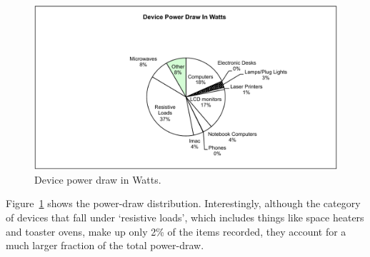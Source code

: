 \begin{figure}[htb!]
\begin{center}
\includegraphics[scale=0.7]{figs/PIE_CHART_SANS_WATTS}
\caption{Device power draw in Watts.}
\label{fig:piechart}
\end{center}
\end{figure}

Figure~\ref{fig:piechart} shows the power-draw distribution.  Interestingly, although the category of devices that 
fall under `resistive loads', which includes things like space heaters
and toaster ovens, make up only 2\% of the items recorded, they
account for a much larger fraction of the total power-draw.


